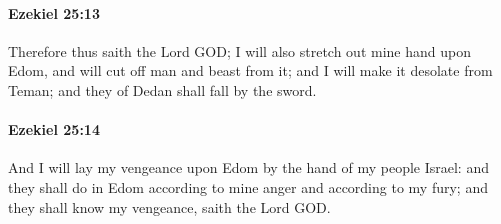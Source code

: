 		\paragraph{Ezekiel 25:13} %
			\label{EZEKIEL-25-13}

			Therefore thus saith the Lord GOD; I will also stretch out mine hand upon Edom, and will cut off man and beast from it; and I will make it desolate from Teman; and they of Dedan shall fall by the sword.


		\paragraph{Ezekiel 25:14} %
			\label{EZEKIEL-25-14}

			And I will lay my vengeance upon Edom by the hand of my people Israel: and they shall do in Edom according to mine anger and according to my fury; and they shall know my vengeance, saith the Lord GOD.

